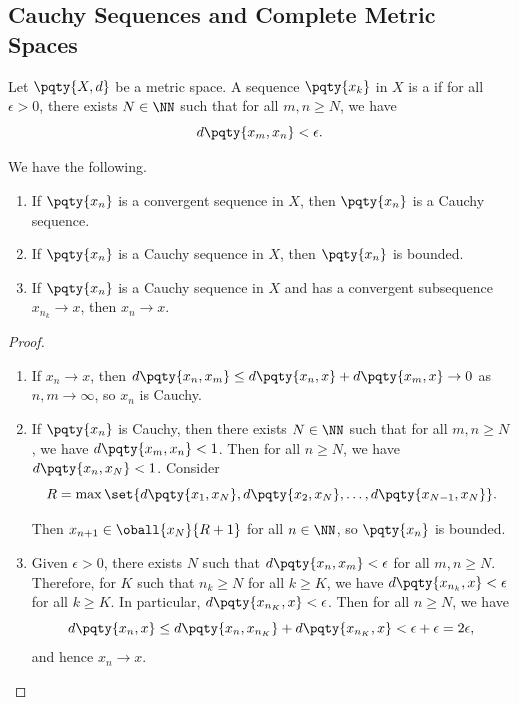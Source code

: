 \subsection{Cauchy Sequences and Complete Metric Spaces}

\begin{definition}
    Let \(\pqty{X, d}\) be a metric space. A sequence \(\pqty{x_k}\) in \(X\) is a  if for all \(\epsilon > 0\), there exists \(N \in \NN\) such that for all \(m, n \geq N\), we have
    \[
        d\pqty{x_m, x_n} < \epsilon.
    \]
\end{definition}

\begin{proposition}
    \label{prop:convergence-implies-cauchy-and-cauchy-implies-bounded-subsequential-convergence}%
    We have the following.
    \begin{enumerate}[label=(\roman*)]
        \item If \(\pqty{x_n}\) is a convergent sequence in \(X\), then \(\pqty{x_n}\) is a Cauchy sequence.
        \item If \(\pqty{x_n}\) is a Cauchy sequence in \(X\), then \(\pqty{x_n}\) is bounded.
        \item If \(\pqty{x_n}\) is a Cauchy sequence in \(X\) and has a convergent subsequence \(x_{n_k} \to x\), then \(x_n \to x\).
    \end{enumerate}
\end{proposition}

\begin{proof}
    \begin{enumerate}[label=(\roman*)]
        \item If \(x_n \to x\), then \(d\pqty{x_n, x_m} \leq d\pqty{x_n, x} + d\pqty{x_m, x} \to 0\) as \(n, m \to \infty\), so \(x_n\) is Cauchy.
        \item If \(\pqty{x_n}\) is Cauchy, then there exists \(N \in \NN\) such that for all \(m, n \geq N\), we have \(d\pqty{x_m, x_n} < 1\). Then for all \(n \geq N\), we have \(d\pqty{x_n, x_N} < 1\). Consider
        \[
            R = \max\set{d\pqty{x_1, x_N}, d\pqty{x_2, x_N}, \ldots, d\pqty{x_{N - 1}, x_N}}.
        \]

        Then \(x_{n + 1} \in \oball{x_N}{R + 1}\) for all \(n \in \NN\), so \(\pqty{x_n}\) is bounded.
        \item Given \(\epsilon > 0\), there exists \(N\) such that \(d\pqty{x_n, x_m} < \epsilon\) for all \(m, n \geq N\). Therefore, for \(K\) such that \(n_k \geq N\) for all \(k \geq K\), we have \(d\pqty{x_{n_k}, x} < \epsilon\) for all \(k \geq K\). In particular, \(d\pqty{x_{n_K}, x} < \epsilon\). Then for all \(n \geq N\), we have
        \[
            d\pqty{x_n, x} \leq d\pqty{x_n, x_{n_K}} + d\pqty{x_{n_K}, x} < \epsilon + \epsilon = 2\epsilon,
        \]
        and hence \(x_n \to x\).
    \end{enumerate}
\end{proof}

